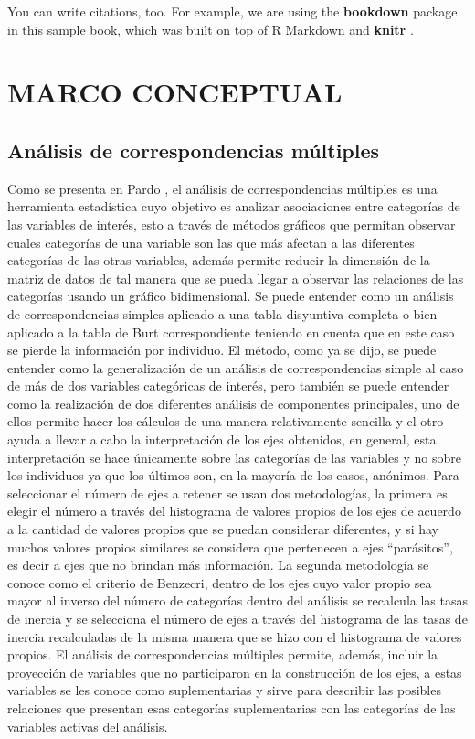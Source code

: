 \documentclass[]{book}
\theoremstyle{definition}
\theoremstyle{definition}
\theoremstyle{definition}
\theoremstyle{remark}
\begin{document}
You can write citations, too. For example, we are using the
\textbf{bookdown} package \citep{R-bookdown} in this sample book, which
was built on top of R Markdown and \textbf{knitr} \citep{xie2015}.

\mainmatter

\chapter{MARCO CONCEPTUAL}\label{marco}

\section{Análisis de correspondencias
múltiples}\label{analisis-de-correspondencias-multiples}

Como se presenta en Pardo \citep[pp.~125 - 163]{Pardo}, el análisis de
correspondencias múltiples es una herramienta estadística cuyo objetivo
es analizar asociaciones entre categorías de las variables de interés,
esto a través de métodos gráficos que permitan observar cuales
categorías de una variable son las que más afectan a las diferentes
categorías de las otras variables, además permite reducir la dimensión
de la matriz de datos de tal manera que se pueda llegar a observar las
relaciones de las categorías usando un gráfico bidimensional. Se puede
entender como un análisis de correspondencias simples aplicado a una
tabla disyuntiva completa o bien aplicado a la tabla de Burt
correspondiente teniendo en cuenta que en este caso se pierde la
información por individuo. El método, como ya se dijo, se puede entender
como la generalización de un análisis de correspondencias simple al caso
de más de dos variables categóricas de interés, pero también se puede
entender como la realización de dos diferentes análisis de componentes
principales, uno de ellos permite hacer los cálculos de una manera
relativamente sencilla y el otro ayuda a llevar a cabo la interpretación
de los ejes obtenidos, en general, esta interpretación se hace
únicamente sobre las categorías de las variables y no sobre los
individuos ya que los últimos son, en la mayoría de los casos, anónimos.
Para seleccionar el número de ejes a retener se usan dos metodologías,
la primera es elegir el número a través del histograma de valores
propios de los ejes de acuerdo a la cantidad de valores propios que se
puedan considerar diferentes, y si hay muchos valores propios similares
se considera que pertenecen a ejes ``parásitos'', es decir a ejes que no
brindan más información. La segunda metodología se conoce como el
criterio de Benzecri, dentro de los ejes cuyo valor propio sea mayor al
inverso del número de categorías dentro del análisis se recalcula las
tasas de inercia y se selecciona el número de ejes a través del
histograma de las tasas de inercia recalculadas de la misma manera que
se hizo con el histograma de valores propios. El análisis de
correspondencias múltiples permite, además, incluir la proyección de
variables que no participaron en la construcción de los ejes, a estas
variables se les conoce como suplementarias y sirve para describir las
posibles relaciones que presentan esas categorías suplementarias con las
categorías de las variables activas del análisis.
\end{document}

